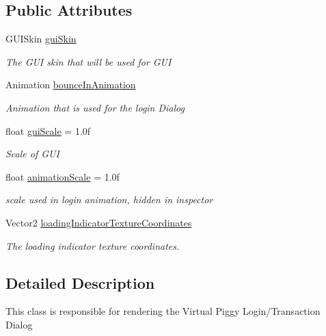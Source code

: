 \subsection*{Public Attributes}
\begin{DoxyCompactItemize}
\item 
G\-U\-I\-Skin \hyperlink{class_virtual_piggy_g_u_i_a6d7bdaef0dd72024639f51008c202130}{gui\-Skin}
\begin{DoxyCompactList}\small\item\em The G\-U\-I skin that will be used for G\-U\-I \end{DoxyCompactList}\item 
Animation \hyperlink{class_virtual_piggy_g_u_i_a0fcb59d1bf578d056d0bc123a89e75f0}{bounce\-In\-Animation}
\begin{DoxyCompactList}\small\item\em Animation that is used for the login Dialog \end{DoxyCompactList}\item 
float \hyperlink{class_virtual_piggy_g_u_i_acef2dc6ac83a1dd3b72796fcce046934}{gui\-Scale} = 1.\-0f
\begin{DoxyCompactList}\small\item\em Scale of G\-U\-I \end{DoxyCompactList}\item 
float \hyperlink{class_virtual_piggy_g_u_i_adb759917612421d1475ba86a7d6dc056}{animation\-Scale} = 1.\-0f
\begin{DoxyCompactList}\small\item\em scale used in login animation, hidden in inspector \end{DoxyCompactList}\item 
Vector2 \hyperlink{class_virtual_piggy_g_u_i_a7464dcd32b13809bf7893ce3ad858bdf}{loading\-Indicator\-Texture\-Coordinates}
\begin{DoxyCompactList}\small\item\em The loading indicator texture coordinates. \end{DoxyCompactList}\end{DoxyCompactItemize}


\subsection{Detailed Description}
This class is responsible for rendering the Virtual Piggy Login/\-Transaction Dialog 



